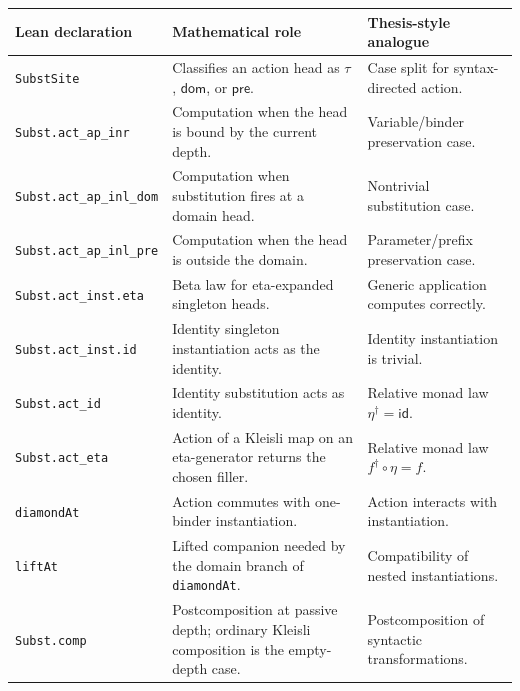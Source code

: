 \documentclass[11pt]{article}
\newcommand{\Code}[1]{\texttt{#1}}
\newcommand{\pre}{\mathsf{pre}}
\newcommand{\dom}{\mathsf{dom}}
\newcommand{\Eta}{\eta}
\begin{document}
\begin{longtable}{>{\raggedright\arraybackslash}p{}
                  >{\raggedright\arraybackslash}p{}
                  >{\raggedright\arraybackslash}p{}}
\toprule
Lean declaration & Mathematical role & Thesis-style analogue \\
\midrule
\Code{SubstSite} & Classifies an action head as \(\tau\), \(\dom\), or
\(\pre\). & Case split for syntax-directed action. \\

\Code{Subst.act\_ap\_inr} & Computation when the head is bound by the
current depth. & Variable/binder preservation case. \\

\Code{Subst.act\_ap\_inl\_dom} & Computation when substitution fires at a
domain head. & Nontrivial substitution case. \\

\Code{Subst.act\_ap\_inl\_pre} & Computation when the head is outside the
domain. & Parameter/prefix preservation case. \\

\Code{Subst.act\_inst.eta} & Beta law for eta-expanded singleton heads. &
Generic application computes correctly. \\

\Code{Subst.act\_inst.id} & Identity singleton instantiation acts as the
identity. & Identity instantiation is trivial. \\

\Code{Subst.act\_id} & Identity substitution acts as identity. & Relative
monad law \(\Eta^\dagger=\mathsf{id}\). \\

\Code{Subst.act\_eta} & Action of a Kleisli map on an eta-generator returns
the chosen filler. & Relative monad law \(f^\dagger\circ\Eta=f\). \\

\Code{diamondAt} & Action commutes with one-binder instantiation. &
Action interacts with instantiation. \\

\Code{liftAt} & Lifted companion needed by the domain branch of
\Code{diamondAt}. & Compatibility of nested instantiations. \\

\Code{Subst.comp} & Postcomposition at passive depth; ordinary Kleisli
composition is the empty-depth case. & Postcomposition of syntactic
transformations. \\


\end{longtable}
\end{document}
